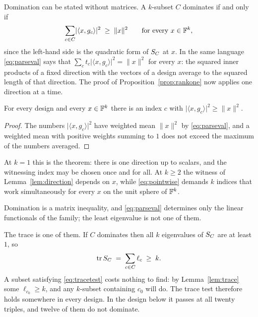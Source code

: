 Domination can be stated without matrices.  A $k$-subset $C$
dominates if and only if
\begin{equation}\label{eq:pointwise}
  \sum_{c\in C}\lvert\langle x,g_c\rangle\rvert^2\;\ge\;\lVert x\rVert^2
  \qquad\text{for every }x\in\mathbb{F}^k ,
\end{equation}
since the left-hand side is the quadratic form of $S_{C}$ at $x$.  In the
same language \eqref{eq:parseval} says that
$\sum_c t_c\lvert\langle x,g_c\rangle\rvert^2=\lVert x\rVert^2$ for every
$x$: the squared inner products of a fixed direction with the vectors of
a design average to the squared length of that direction.  The proof of
Proposition~\ref{prop:rankone} now applies one direction at a time.

\begin{lemma}[Lean]\label{lem:direction}
For every design and every $x\in\mathbb{F}^k$ there is an index $c$ with
$\lvert\langle x,g_c\rangle\rvert^2\ge\lVert x\rVert^2$.
\end{lemma}

\begin{proof}
The numbers $\lvert\langle x,g_c\rangle\rvert^2$ have weighted mean
$\lVert x\rVert^2$ by \eqref{eq:parseval}, and a weighted mean with
positive weights summing to $1$ does not exceed the maximum of the
numbers averaged.
\end{proof}

At $k=1$ this is the theorem: there is one direction up to scalars, and
the witnessing index may be chosen once and for all.  At $k\ge2$ the
witness of Lemma~\ref{lem:direction} depends on $x$, while
\eqref{eq:pointwise} demands $k$ indices that work simultaneously for
every $x$ on the unit sphere of $\mathbb{F}^k$.

Domination is a matrix inequality, and \eqref{eq:parseval} determines
only the linear functionals of the family; the least eigenvalue is not
one of them.

The trace is one of them.  If $C$ dominates then all $k$ eigenvalues of
$S_{C}$ are at least $1$, so
\begin{equation}\label{eq:tracetest}
  \operatorname{tr}S_{C}\;=\;\sum_{c\in C}\ell_c\;\ge\;k .
\end{equation}
A subset satisfying \eqref{eq:tracetest} costs nothing to find: by
Lemma~\ref{lem:trace} some $\ell_{c_0}\ge k$, and any $k$-subset
containing $c_0$ will do.  The trace test therefore holds somewhere in
every design.  In the design below it passes at all twenty triples, and
twelve of them do not dominate.

